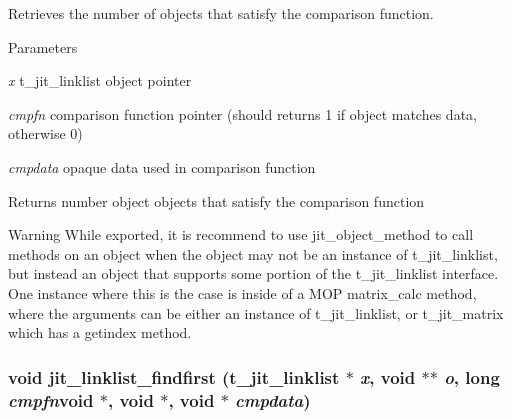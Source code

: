 Retrieves the number of objects that satisfy the comparison function. 
\begin{DoxyParams}{Parameters}
\item[{\em x}]t\_\-jit\_\-linklist object pointer \item[{\em cmpfn}]comparison function pointer (should returns 1 if object matches data, otherwise 0) \item[{\em cmpdata}]opaque data used in comparison function\end{DoxyParams}
\begin{DoxyReturn}{Returns}
number object objects that satisfy the comparison function
\end{DoxyReturn}
\begin{DoxyWarning}{Warning}
While exported, it is recommend to use jit\_\-object\_\-method to call methods on an object when the object may not be an instance of t\_\-jit\_\-linklist, but instead an object that supports some portion of the t\_\-jit\_\-linklist interface. One instance where this is the case is inside of a MOP matrix\_\-calc method, where the arguments can be either an instance of t\_\-jit\_\-linklist, or t\_\-jit\_\-matrix which has a getindex method. 
\end{DoxyWarning}
\hypertarget{group__linklistmod_gad879a11361215edf7d233c8c67ec66f9}{
\subsubsection[{jit\_\-linklist\_\-findfirst}]{\setlength{\rightskip}{0pt plus 5cm}void jit\_\-linklist\_\-findfirst (t\_\-jit\_\-linklist $\ast$ {\em x}, \/  void $\ast$$\ast$ {\em o}, \/  long  {\em cmpfn}void $\ast$, void $\ast$, \/  void $\ast$ {\em cmpdata})}}
\label{group__linklistmod_gad879a11361215edf7d233c8c67ec66f9}


